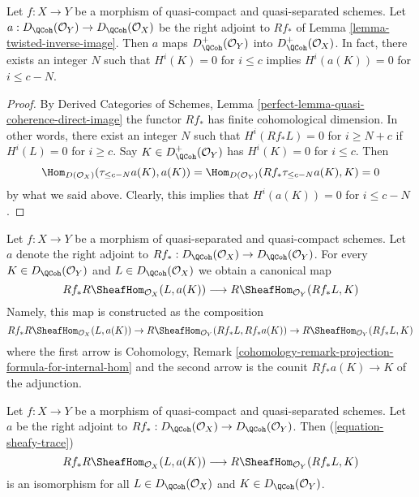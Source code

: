 \begin{lemma}
\label{lemma-twisted-inverse-image-bounded-below}
Let $f : X \to Y$ be a morphism of quasi-compact and quasi-separated
schemes. Let $a : D_\QCoh(\mathcal{O}_Y) \to D_\QCoh(\mathcal{O}_X)$
be the right adjoint to $Rf_*$ of Lemma \ref{lemma-twisted-inverse-image}.
Then $a$ maps $D^+_\QCoh(\mathcal{O}_Y)$ into $D^+_\QCoh(\mathcal{O}_X)$.
In fact, there exists an integer $N$ such that
$H^i(K) = 0$ for $i \leq c$ implies $H^i(a(K)) = 0$ for $i \leq c - N$.
\end{lemma}

\begin{proof}
By Derived Categories of Schemes, Lemma
\ref{perfect-lemma-quasi-coherence-direct-image}
the functor $Rf_*$ has finite cohomological dimension. In other words,
there exist an integer $N$ such that
$H^i(Rf_*L) = 0$ for $i \geq N + c$ if $H^i(L) = 0$ for $i \geq c$.
Say $K \in D^+_\QCoh(\mathcal{O}_Y)$ has $H^i(K) = 0$ for $i \leq c$.
Then
$$
\Hom_{D(\mathcal{O}_X)}(\tau_{\leq c - N}a(K), a(K)) =
\Hom_{D(\mathcal{O}_Y)}(Rf_*\tau_{\leq c - N}a(K), K) = 0
$$
by what we said above. Clearly, this implies that
$H^i(a(K)) = 0$ for $i \leq c - N$.
\end{proof}

\noindent
Let $f : X \to Y$ be a morphism of quasi-separated and quasi-compact
schemes. Let $a$ denote the right adjoint to
$Rf_* : D_\QCoh(\mathcal{O}_X) \to D_\QCoh(\mathcal{O}_Y)$. For every
$K \in D_\QCoh(\mathcal{O}_Y)$ and $L \in D_\QCoh(\mathcal{O}_X)$
we obtain a canonical map
\begin{equation}
\label{equation-sheafy-trace}
Rf_*R\SheafHom_{\mathcal{O}_X}(L, a(K))
\longrightarrow
R\SheafHom_{\mathcal{O}_Y}(Rf_*L, K)
\end{equation}
Namely, this map is constructed as the composition
$$
Rf_*R\SheafHom_{\mathcal{O}_X}(L, a(K)) \to
R\SheafHom_{\mathcal{O}_Y}(Rf_*L, Rf_*a(K)) \to
R\SheafHom_{\mathcal{O}_Y}(Rf_*L, K)
$$
where the first arrow is 
Cohomology, Remark
\ref{cohomology-remark-projection-formula-for-internal-hom}
and the second arrow is the counit $Rf_*a(K) \to K$ of the adjunction.

\begin{lemma}
\label{lemma-iso-on-RSheafHom}
Let $f : X \to Y$ be a morphism of quasi-compact and quasi-separated schemes.
Let $a$ be the right adjoint to
$Rf_* : D_\QCoh(\mathcal{O}_X) \to D_\QCoh(\mathcal{O}_Y)$.
Then (\ref{equation-sheafy-trace})
$$
Rf_*R\SheafHom_{\mathcal{O}_X}(L, a(K))
\longrightarrow
R\SheafHom_{\mathcal{O}_Y}(Rf_*L, K)
$$
is an isomorphism for all $L \in D_\QCoh(\mathcal{O}_X)$ and
$K \in D_\QCoh(\mathcal{O}_Y)$.
\end{lemma}


